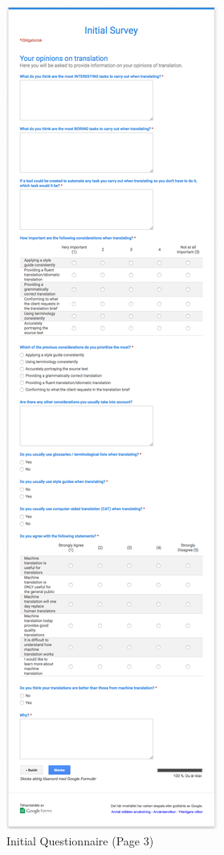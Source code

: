 \begin{figure}[H]
\myfloatalign
\includegraphics[height=\textheight]{img/initial_questionnaire/initial_4.png}
\caption{Initial Questionnaire (Page 3)}
\end{figure}

